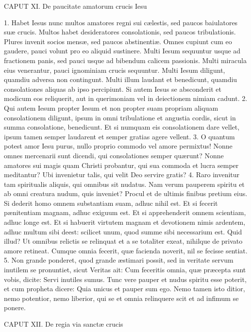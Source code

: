 \documentclass[twoside]{article}
\begin{document}
CAPUT XI.
De paucitate amatorum crucis Iesu

1. Habet Iesus nunc multos amatores regni sui cælestis, sed paucos baiulatores suæ crucis. Multos habet desideratores consolationis, sed paucos tribulationis. Plures invenit socios mensæ, sed paucos abstinentiæ. Omnes cupiunt cum eo gaudere, pauci volunt pro eo aliquid sustinere. Multi Iesum sequuntur usque ad fractionem panis, sed pauci usque ad bibendum calicem passionis. Multi miracula eius venerantur, pauci ignominiam crucis sequuntur. Multi Iesum diligunt, quamdiu adversa non contingunt. Multi illum laudant et benedicunt, quamdiu consolationes aliquas ab ipso percipiunt. Si autem Iesus se absconderit et modicum eos reliquerit, aut in querimoniam vel in deiectionem nimiam cadunt.
2. Qui autem Iesum propter Iesum et non propter suam propriam aliquam consolationem diligunt, ipsum in omni tribulatione et angustia cordis, sicut in summa consolatione, benedicunt. Et si numquam eis consolationem dare vellet, ipsum tamen semper laudarent et semper gratias agere vellent.
3. O quantum potest amor Iesu purus, nullo proprio commodo vel amore permixtus! Nonne omnes mercenarii sunt dicendi, qui consolationes semper quærunt? Nonne amatores sui magis quam Christi probantur, qui sua commoda et lucra semper meditantur? Ubi invenietur talis, qui velit Deo servire gratis?
4. Raro invenitur tam spiritualis aliquis, qui omnibus sit nudatus. Nam verum pauperem spiritu et ab omni creatura nudum, quis inveniet? Procul et de ultimis finibus pretium eius. Si dederit homo omnem substantiam suam, adhuc nihil est. Et si fecerit pænitentiam magnam, adhuc exiguum est. Et si apprehenderit omnem scientiam, adhuc longe est. Et si habuerit virtutem magnam et devotionem nimis ardentem, adhuc multum sibi deest: scilicet unum, quod summe sibi necessarium est. Quid illud? Ut omnibus relictis se relinquat et a se totaliter exeat, nihilque de privato amore retineat. Cumque omnia fecerit, quæ facienda noverit, nil se fecisse sentiat.
5. Non grande ponderet, quod grande æstimari possit, sed in veritate servum inutilem se pronuntiet, sicut Veritas ait: Cum feceritis omnia, quæ præcepta sunt vobis, dicite: Servi inutiles sumus. Tunc vere pauper et nudus spiritu esse poterit, et cum propheta dicere: Quia unicus et pauper sum ego. Nemo tamen isto ditior, nemo potentior, nemo liberior, qui se et omnia relinquere scit et ad infimum se ponere.


CAPUT XII.
De regia via sanctæ crucis
\end{document}
